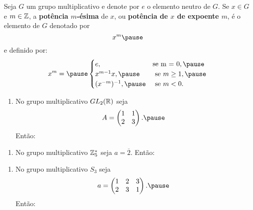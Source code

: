 \documentclass{beamer}
\begin{document}
    \begin{frame}
        Seja $G$ um grupo multiplicativo \pause e denote por $e$ o elemento neutro de $G$. \pause Se $x \in G$ \pause e $m \in \mathbb{Z}$, \pause a \textbf{potência $m$-ésima} de $x$, \pause ou \textbf{potência de $x$ de expoente $m$}, \pause é o elemento de $G$ denotado por \pause
        \[
            x^m \pause
        \]
        e definido por: \pause
        \[
            x^m = \pause \begin{cases}
                    e, & \mbox{se m = 0}, \pause\\
                    x^{m-1}x, \pause & \mbox{ se } m \ge 1, \pause\\
                    (x^{-m})^{-1}, \pause & \mbox{ se } m < 0.
                   \end{cases}
        \]

    \end{frame}

    \begin{frame}
        \begin{exemplos}
            \begin{enumerate}[label={\roman*})]
                \item No grupo multiplicativo $GL_2(\mathbb{R})$ \pause seja \pause
                \[
                    A = \begin{pmatrix}
                        1 & 1\\2 & 3
                    \end{pmatrix}. \pause
                \]
                Então:
                \seti
            \end{enumerate}
        \end{exemplos}
    \end{frame}

    \begin{frame}
        \begin{exemplos}
            \begin{enumerate}[label={\roman*})]
                \conti
                \item No grupo multiplicativo $\mathbb{Z}_5^*$ \pause seja $a = \overline{2}$. \pause Então:
                \seti
            \end{enumerate}
        \end{exemplos}
    \end{frame}

    \begin{frame}
        \begin{exemplos}
            \begin{enumerate}[label={\roman*})]
                \conti
                \item No grupo multiplicativo $S_3$ \pause seja
                \[
                    a = \begin{pmatrix}
                        1 & 2 & 3\\ 2 & 3 & 1
                    \end{pmatrix}.\pause
                \]
                Então:
            \end{enumerate}
        \end{exemplos}
    \end{frame}
\end{document}
